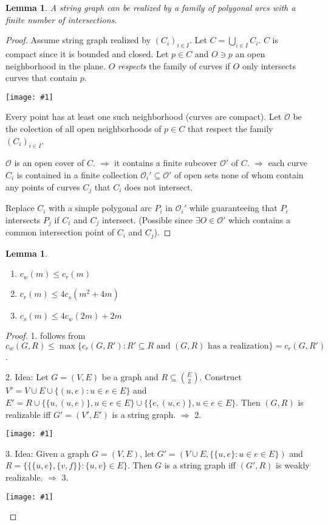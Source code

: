 \documentclass[12pt]{article}
\theoremstyle{plain} %
\newtheorem{lemma}[theorem]{Lemma}
\newcommand{\set}[1]{\{#1\}}
\newcommand{\image}[1]{\begin{center}\texttt{[image: \#1]}\end{center}}
\begin{document}
\begin{lemma}\label{lem:finite-intersections}
A string graph can be realized by a family of polygonal arcs with a finite number of intersections.
\end{lemma}

\begin{proof}
Assume string graph realized by \( (C_i)_{i\in I} \). Let \(C = \bigcup_{i\in I} C_i\).
\(C\) is compact since it is bounded and closed. Let \(p \in C\) and \(O \ni p\) an open neighborhood 
in the plane. \(O\) \textit{respects} the family of curves if \(O\) only intersects curves that contain \(p\).

\image{images/figure-1.jpeg}

Every point has at least one such neighborhood (curves are compact). 
Let \(\mathcal{O}\) be the colection of all open neighborhoods of \(p\in C\) that respect 
the family \((C_i)_{i\in I}\). 

\(\mathcal{O}\) is an open cover of \(C\). \(\Rightarrow\) it contains a finite subcover 
\(\mathcal{O}'\) of \(C\). \(\Rightarrow\) each curve \(C_i\) is contained 
in a finite collection \(\mathcal{O}_i' \subseteq \mathcal{O}'\) of open sets
none of whom contain any points of curves \(C_j\) that \(C_i\) does not intersect. 

Replace \(C_i\) with a simple polygonal arc \(P_i\) in \(\mathcal{O}_i'\) 
while guaranteeing that \(P_i\) intersects \(P_j\) if \(C_i\) and \(C_j\) intersect.
(Possible since \(\exists O \in \mathcal{O}'\) which contains a common intersection point of \(C_i\) and \(C_j\)).
\end{proof}

\begin{lemma}\ 
\begin{enumerate}
    \item \(c_w(m) \leq c_r(m)\)
    \item \( c_r(m) \leq 4 c_s(m^2 + 4m) \)
    \item \(c_s(m) \leq 4 c_w(2m) + 2m\)
\end{enumerate}
\end{lemma}

\begin{proof}
1. follows from \(c_w(G, R) \leq \max\set{c_r(G, R'): R' \subseteq R \text{ and } (G,R) \text{ has a realization}} = c_r(G, R') \).

2. Idea: Let \(G = (V, E)\) be a graph and \(R \subseteq \binom{E}{2}\). Construct \(V' = V \cup E \cup \set{(u, e) : u \in e \in E}\) 
and \(E' = R \cup \set{ \set{u, (u,e)}, u \in e \in E} \cup \set{\set{e, (u,e)}, u\in e \in E}\). Then \((G, R)\) is realizable iff 
\(G' = (V', E')\) is a string graph. \(\Rightarrow \) 2.

\image{images/figure-2.jpeg}

3. Idea: Given a graph \(G = (V, E)\), let \(G' = (V \cup E, \set{\set{u,e} : u \in e \in E})\) and 
\(R = \set{\set{\set{u,e}, \set{v,f}} : \set{u,v} \in E}\). Then \(G\) is a string graph iff \((G', R)\) 
is weakly realizable. \(\Rightarrow \) 3.

\image{images/figure-3.jpeg}
\end{proof}
\end{document}
